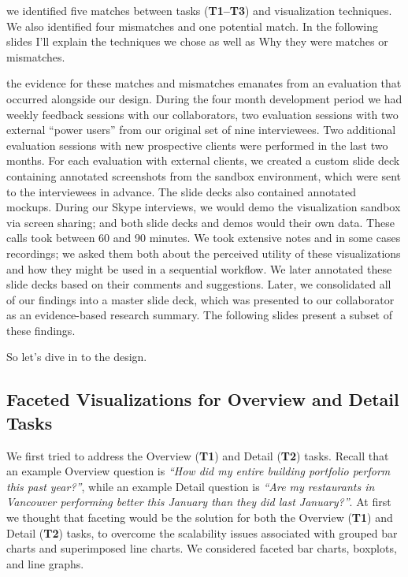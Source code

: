 \documentclass[journal]{vgtc}                %
\newcommand{\bstart}[1]{\vspace{1mm} \noindent{\textbf{#1:}}}
\begin{document}
\bstart{Matches \& mismatches} we identified five matches between tasks ({\bf T1--T3}) and visualization techniques. 
We also identified four mismatches and one potential match. 
In the following slides I'll explain the techniques we chose as well as Why they were matches or mismatches.

\bstart{Evaluation} the evidence for these matches and mismatches emanates from an evaluation that occurred alongside our design. 
During the four month development period we had weekly feedback sessions with our collaborators, two evaluation sessions with two external ``power users'' from our original set of nine interviewees. 
Two additional evaluation sessions with new prospective clients were performed in the last two months.
For each evaluation with external clients, we created a custom slide deck containing annotated screenshots from the sandbox environment, which were sent to the interviewees in advance. 
The slide decks also contained annotated mockups. 
During our Skype interviews, we would demo the visualization sandbox via screen sharing; and both slide decks and demos would their own data. 
These calls took between 60 and 90 minutes. 
We took extensive notes and in some cases recordings; we asked them both about the perceived utility of these visualizations and how they might be used in a sequential workflow. 
We later annotated these slide decks based on their comments and suggestions.
Later, we consolidated all of our findings into a master slide deck, which was presented to our collaborator as an evidence-based research summary. 
The following slides present a subset of these findings.

So let's dive in to the design.


\subsection{Faceted Visualizations for Overview and Detail Tasks}
\label{design-faceting}


We first tried to address the Overview ({\bf T1}) and Detail ({\bf T2}) tasks. 
Recall that an example Overview question is {\it ``How did my entire building portfolio perform this past year?''}, while an example Detail question is {\it ``Are my restaurants in Vancouver performing better this January than they did last January?''}.
At first we thought that faceting would be the solution for both the Overview ({\bf T1}) and Detail ({\bf T2}) tasks, to overcome the scalability issues associated with grouped bar charts and superimposed line charts.
We considered faceted bar charts, boxplots, and line graphs.
\end{document}
